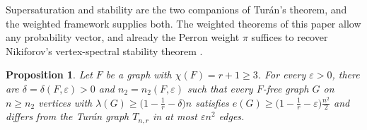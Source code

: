 \documentclass[11pt, a4paper]{article}
\newtheorem{proposition}[theorem]{Proposition}
\theoremstyle{definition}
\theoremstyle{plain}
\renewcommand{\ge}{\geqslant}
\begin{document}
Supersaturation and stability are the two companions
of Tur\'an's theorem, and the weighted framework supplies both.
The weighted theorems of this paper 
allow any probability vector, 
and already the Perron weight  
$\pi$ suffices to recover Nikiforov's vertex-spectral stability theorem \cite{Niki2009jgt}. 




\begin{proposition}\label{prop:vertex-stability}
Let $F$ be a graph with $\chi (F)=r+1\ge 3$.
For every $\varepsilon >0$, there are
$\delta =\delta (F,\varepsilon )>0$ and
$n_2=n_2(F,\varepsilon )$ such that 
every $F$-free graph $G$ on $n\ge n_2$ vertices with
$\lambda (G)\ge \bigl(1-\frac1r-\delta \bigr)n$ satisfies
$e(G)\ge \bigl(1-\frac1r-\varepsilon \bigr)\frac{n^{2}}{2}$  and differs from the Tur\'{a}n graph $T_{n,r}$ in at most $\varepsilon n^{2}$ edges.
\end{proposition}
\end{document}
